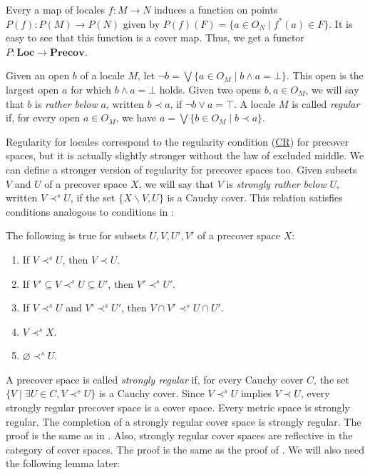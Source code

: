 \documentclass[reqno]{amsart}
\newcommand{\axref}[1]{(\hyperref[ax:#1]{#1})}
\theoremstyle{definition}
\theoremstyle{remark}
\numberwithin{figure}{section}
\newcommand{\rb}{\prec}
\newcommand{\cat}[1]{\mathbf{#1}}
\begin{document}
Every a map of locales $f : M \to N$ induces a function on points $P(f) : P(M) \to P(N)$ given by $P(f)(F) = \{ a \in O_N \mid f^*(a) \in F \}$.
It is easy to see that this function is a cover map.
Thus, we get a functor $P : \cat{Loc} \to \cat{Precov}$.

Given an open $b$ of a locale $M$, let $\neg b = \bigvee \{ a \in O_M \mid b \wedge a = \bot \}$.
This open is the largest open $a$ for which $b \wedge a = \bot$ holds.
Given two opens $b,a \in O_M$, we will say that $b$ is \emph{rather below} $a$, written $b \rb a$, if $\neg b \vee a = \top$.
A locale $M$ is called \emph{regular} if, for every open $a \in O_M$, we have $a = \bigvee \{ b \in O_M \mid b \rb a \}$.

Regularity for locales correspond to the regularity condition \axref{CR} for precover spaces, but it is actually slightly stronger without the law of excluded middle.
We can define a stronger version of regularity for precover spaces too.
Given subsets $V$ and $U$ of a precover space $X$, we will say that $V$ is \emph{strongly rather below} $U$, written $V \rb^s U$, if the set $\{ X \backslash V, U \}$ is a Cauchy cover.
This relation satisfies conditions analogous to conditions in :

\begin{prop}
The following is true for subsets $U,V,U',V'$ of a precover space $X$:
\begin{enumerate}
\item If $V \rb^s U$, then $V \rb U$.
\item If $V' \subseteq V \rb^s U \subseteq U'$, then $V' \rb^s U'$.
\item If $V \rb^s U$ and $V' \rb^s U'$, then $V \cap V' \rb^s U \cap U'$.
\item $V \rb^s X$.
\item $\varnothing \rb^s U$.
\end{enumerate}
\end{prop}

A precover space is called \emph{strongly regular} if, for every Cauchy cover $C$, the set $\{ V \mid \exists U \in C, V \rb^s U \}$ is a Cauchy cover.
Since $V \rb^s U$ implies $V \rb U$, every strongly regular precover space is a cover space.
Every metric space is strongly regular.
The completion of a strongly regular cover space is strongly regular.
The proof is the same as in .
Also, strongly regular cover spaces are reflective in the category of cover spaces.
The proof is the same as the proof of .
We will also need the following lemma later:
\end{document}
